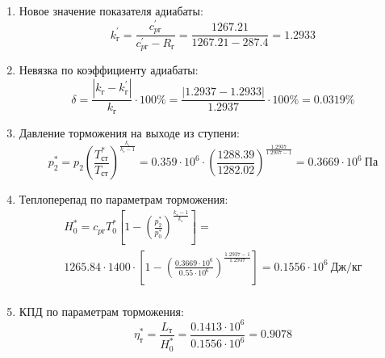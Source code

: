\documentclass[a4paper,10pt]{article}
\begin{document}
\begin{enumerate}
        \item Новое значение показателя адиабаты:
        \[
            k_г^\prime = \frac{c_{pг}^\prime}{c_{pг}^\prime - R_г} =
                \frac{
                    1267.21
                }{
                    1267.21 - 287.4
                }
            = 1.2933
        \]

        \item Невязка по коэффициенту адиабаты:
        \[
            \delta = \frac{ \left| k_г - k_г^\prime \right| }{ k_г } \cdot 100 \%=
                \frac{
                    \left| 1.2937 - 1.2933 \right|
                }{
                    1.2937
                } \cdot 100 \% =
            0.0319 \%
        \]

        \item Давление торможения на выходе из ступени:
        \[
            p_2^* = p_2 \left(
                            \frac{ T_{ст}^* }{ T_{ст} }
                    \right) ^ \frac{ k_г }{ k_г - 1 } =
                 0.359 \cdot 10^6 \cdot \left(
                            \frac{ 1288.39 }{ 1282.02 }
                    \right) ^
                \frac{ 1.2937 }{ 1.2937 - 1 } =
            0.3669 \cdot 10^6 \ Па
        \]

        \item Теплоперепад по параметрам торможения:
        \begin{gather*}
            H_0^* = c_{pг} T_0^* \left[
                        1 - \left(
                                \frac{p_2^*}{p_0^*}
                            \right) ^
                        \frac{k_г - 1}{k_г}
                    \right] =\\
            1265.84 \cdot 1400 \cdot
                    \left[
                        1 - \left(
                                \frac{
                                    0.3669 \cdot 10^6
                                }{
                                    0.55 \cdot 10^6
                                }
                            \right) ^
                        \frac{1.2937 - 1}{1.2937}
                    \right]
            = 0.1556 \cdot 10^6 \ Дж/кг\\
        \end{gather*}

        \item КПД по параметрам торможения:
        \[
            \eta_т^* = \frac{ L_т }{ H_0^* } =
                \frac{
                    0.1413 \cdot 10^6
                }{
                    0.1556 \cdot 10^6 } =
            0.9078
        \]


\end{enumerate}
\end{document}
